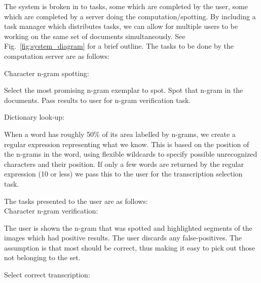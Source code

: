 \documentclass[ms]{byuprop}
\begin{document}
The system is broken in to tasks, some which are completed by the user, some which are completed by a server doing the computation/spotting. By including a task manager which distributes tasks, we can allow for multiple users to be working on the same set of documents simultaneously. See Fig.~\ref{fig:system_diagram} for a brief outline. The tasks to be done by the computation server are as follows:
\\[.5cm]
{\setlength{\parindent}{0cm}
\hspace{2cm} Character n-gram spotting:

\begin{addmargin}[3em]{3em}
Select the most promising n-gram exemplar to spot. Spot that n-gram in the documents. Pass results to user for n-gram verification task.
\\[.5cm]
\end{addmargin}


Dictionary look-up:

\begin{addmargin}[3em]{3em}
When a word has roughly 50\% of its area labelled by n-grams, we create a regular expression representing what we know. This is based on the position of the n-grams in the word, using flexible wildcards to specify possible unrecognized characters and their position. If only a few words are returned by the regular expression (10 or less) we pass this to the user for the transcription selection task.
\\[.5cm]
\end{addmargin}





The tasks presented to the user are as follows:
\\[.5cm]

Character n-gram verification:

\begin{addmargin}[3em]{3em}
The user is shown the n-gram that was spotted and highlighted segments of the images which had positive results. The user discards any false-positives. The assumption is that most should be correct, thus making it easy to pick out those not belonging to the set.
\\[.5cm]
\end{addmargin}

Select correct transcription:

}
\end{document}
